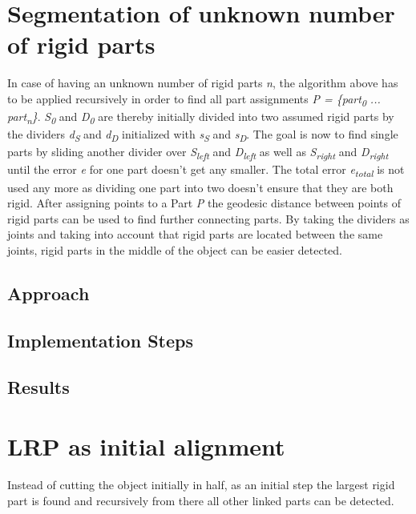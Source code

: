 \section{Segmentation of unknown number of rigid parts}

In case of having an unknown number of rigid parts \textit{n}, the algorithm above has to be applied recursively in order to find all part assignments \textit{P = \{{part\textsubscript{0} ... part\textsubscript{n}\}}}. \textit{S\textsubscript{0}} and \textit{D\textsubscript{0}} are thereby initially divided into two assumed rigid parts by the dividers \textit{d\textsubscript{S}} and \textit{d\textsubscript{D}} initialized with \textit{s\textsubscript{S}} and \textit{s\textsubscript{D}}. The goal is now to find single parts by sliding another divider over \textit{S\textsubscript{left}} and \textit{D\textsubscript{left}} as well as \textit{S\textsubscript{right}} and \textit{D\textsubscript{right}} until the error \textit{e} for one part doesn't get any smaller. The total error \textit{e\textsubscript{total}} is not used any more as dividing one part into two doesn't ensure that they are both rigid. After assigning points to a Part \textit{P} the geodesic distance between points of rigid parts can be used to find further connecting parts. By taking the dividers as joints and taking into account that rigid parts are located between the same joints, rigid parts in the middle of the object can be easier detected.

\subsection{Approach}

\subsection{Implementation Steps}

\subsection{Results}

\section{LRP as initial alignment}

Instead of cutting the object initially in half, as an initial step the largest rigid part is found and recursively from there all other linked parts can be detected.

